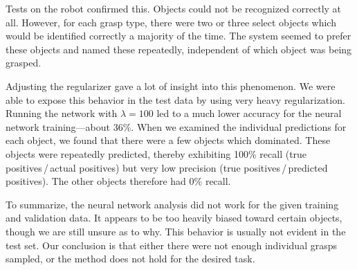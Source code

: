 Tests on the robot confirmed this. Objects could not be recognized correctly at all. However, for each grasp type, there were two or three select objects which would be identified correctly a majority of the time. The system seemed to prefer these objects and named these repeatedly, independent of which object was being grasped.

Adjusting the regularizer gave a lot of insight into this phenomenon. We were able to expose this behavior in the test data by using very heavy regularization. Running the network with $\lambda = 100$ led to a much lower accuracy for the neural network training---about 36\%. When we examined the individual predictions for each object, we found that there were a few objects which dominated. These objects were repeatedly predicted, thereby exhibiting 100\% recall (true positives\,/\,actual positives) but very low precision (true positives\,/\,predicted positives). The other objects therefore had 0\% recall.

To summarize, the neural network analysis did not work for the given training and validation data. It appears to be too heavily biased toward certain objects, though we are still unsure as to why. This behavior is usually not evident in the test set. Our conclusion is that either there were not enough individual grasps sampled, or the method does not hold for the desired task.